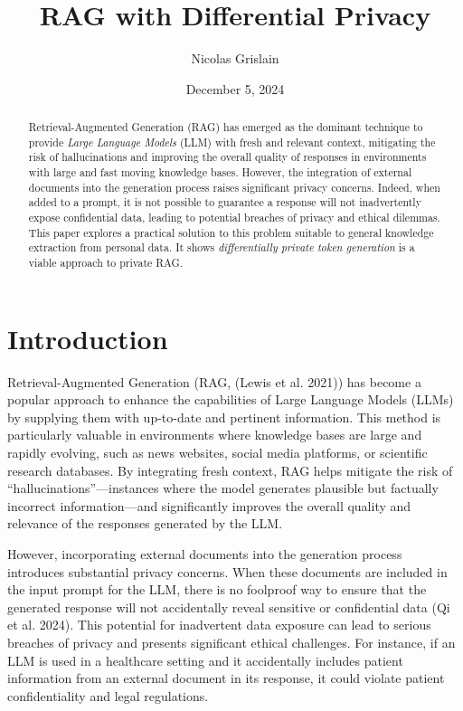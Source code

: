 \documentclass[
  12pt,
  a4paper,
]{article}
\title{RAG with Differential Privacy}
\author{Nicolas Grislain}
\date{December 5, 2024}
\begin{document}
\maketitle
\begin{abstract}
Retrieval-Augmented Generation (RAG) has emerged as the dominant
technique to provide \emph{Large Language Models} (LLM) with fresh and
relevant context, mitigating the risk of hallucinations and improving
the overall quality of responses in environments with large and fast
moving knowledge bases. However, the integration of external documents
into the generation process raises significant privacy concerns. Indeed,
when added to a prompt, it is not possible to guarantee a response will
not inadvertently expose confidential data, leading to potential
breaches of privacy and ethical dilemmas. This paper explores a
practical solution to this problem suitable to general knowledge
extraction from personal data. It shows \emph{differentially private
token generation} is a viable approach to private RAG.
\end{abstract}

\section{Introduction}\label{introduction}

Retrieval-Augmented Generation (RAG, (Lewis et al. 2021)) has become a
popular approach to enhance the capabilities of Large Language Models
(LLMs) by supplying them with up-to-date and pertinent information. This
method is particularly valuable in environments where knowledge bases
are large and rapidly evolving, such as news websites, social media
platforms, or scientific research databases. By integrating fresh
context, RAG helps mitigate the risk of ``hallucinations''---instances
where the model generates plausible but factually incorrect
information---and significantly improves the overall quality and
relevance of the responses generated by the LLM.

However, incorporating external documents into the generation process
introduces substantial privacy concerns. When these documents are
included in the input prompt for the LLM, there is no foolproof way to
ensure that the generated response will not accidentally reveal
sensitive or confidential data (Qi et al. 2024). This potential for
inadvertent data exposure can lead to serious breaches of privacy and
presents significant ethical challenges. For instance, if an LLM is used
in a healthcare setting and it accidentally includes patient information
from an external document in its response, it could violate patient
confidentiality and legal regulations.
\end{document}

